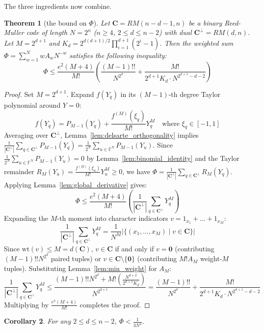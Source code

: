 \documentclass[11pt,a4paper]{article}
\newtheorem{theorem}{Theorem}[section]
\newtheorem{corollary}[theorem]{Corollary}
\theoremstyle{definition}
\newcommand{\FF}{\mathbb{F}}
\begin{document}
\medskip\noindent The three ingredients now combine.

\begin{theorem}[the bound on $\Phi$]
\label{prop:Phi}
Let $\mathbf{C} = RM(n-d-1, n)$ be a binary Reed-Muller code of length $N = 2^n$ ($n \ge 4$, $2 \le d \le n-2$) with dual $\mathbf{C}^\perp = RM(d, n)$. Let $M = 2^{d+1}$ and $K_d = 2^{d(d+1)/2} \prod_{i=1}^{d+1} (2^i - 1)$. Then the weighted sum $\Phi = \sum_{w=1}^N w A_w N^{-w}$ satisfies the following inequality:
\[
\Phi \le \frac{e^2(M+4)}{M!} \left( \frac{(M-1)!!}{N^{2^d}} + \frac{M!}{2^{d+1} K_d \cdot N^{2^{d+1} - d - 2}} \right)
\]
\end{theorem}

\begin{proof}
Set $M = 2^{d+1}$. Expand $f(Y_q)$ in its $(M-1)$-th degree Taylor polynomial around $Y = 0$:
\[
f(Y_q) = P_{M-1}(Y_q) + \frac{f^{(M)}(\xi_q)}{M!} Y_q^M \quad \text{where } \xi_q \in [-1, 1]
\]
Averaging over $\mathbf{C}^\perp$, Lemma~\ref{lem:delsarte_orthogonality} implies $\frac{1}{|\mathbf{C}^\perp|} \sum_{q \in \mathbf{C}^\perp} P_{M-1}(Y_q) = \frac{1}{2^N}\sum_{u \in \FF^N}P_{M-1}(Y_u)$. Since $\frac{1}{2^N}\sum_{u \in \FF^N}P_{M-1}(Y_u) = 0$ by Lemma~\ref{lem:binomial_identity} and the Taylor remainder $R_M(Y_u) = \frac{f^{(M)}(\xi_u)}{M!} Y_u^M \ge 0$, we have $\Phi = \frac{1}{|\mathbf{C}^\perp|}\sum_{q \in \mathbf{C}^\perp}R_M(Y_q)$. Applying Lemma~\ref{lem:global_derivative} gives:
\[
\Phi \le \frac{e^2(M+4)}{M!} \left( \frac{1}{|\mathbf{C}^\perp|} \sum_{q \in \mathbf{C}^\perp} Y_q^M \right)
\]
Expanding the $M$-th moment into character indicators $v = 1_{x_1} + \dots + 1_{x_M}$:
\[
\frac{1}{|\mathbf{C}^\perp|} \sum_{q \in \mathbf{C}^\perp} Y_q^M = \frac{1}{N^M} \left| \{ (x_1, \dots, x_M) \mid v \in \mathbf{C} \} \right|
\]
Since $\text{wt}(v) \le M = d(\mathbf{C})$, $v \in \mathbf{C}$ if and only if $v = \mathbf{0}$ (contributing $(M-1)!! N^{2^d}$ paired tuples) or $v \in \mathbf{C} \setminus \{\mathbf{0}\}$ (contributing $M! A_M$ weight-$M$ tuples). Substituting Lemma~\ref{lem:min_weight} for $A_M$:
\[
\frac{1}{|\mathbf{C}^\perp|} \sum_{q \in \mathbf{C}^\perp} Y_q^M \le \frac{(M-1)!! N^{2^d} + M! \left( \frac{N^{d+2}}{2^{d+1} K_d} \right)}{N^{2^{d+1}}} = \frac{(M-1)!!}{N^{2^d}} + \frac{M!}{2^{d+1} K_d \cdot N^{2^{d+1} - d - 2}}
\]
Multiplying by $\frac{e^2(M+4)}{M!}$ completes the proof.
\end{proof}

\begin{corollary}
\label{cor:d2_eval}
For any $2 \le d \le n - 2$, $\Phi < \frac{1}{3 N^4}$.
\end{corollary}
\end{document}
